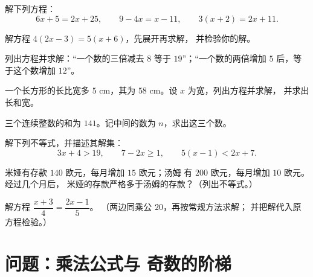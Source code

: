 \begin{exercise}[$\star$]\label{exo:g8:equations:5}
解下列方程：
\[
6x + 5 = 2x + 25, \qquad
9 - 4x = x - 11, \qquad
3(x + 2) = 2x + 11 .
\]
\end{exercise}

\begin{exercise}[$\star$]\label{exo:g8:equations:6}
解方程 $4(2x - 3) = 5(x + 6)$，先展开再求解，
并检验你的解。
\end{exercise}

\begin{exercise}[$\star$]\label{exo:g8:equations:7}
列出方程并求解：“一个数的三倍减去 $8$ 等于
$19$”；“一个数的两倍增加 $5$ 后，等于这个数增加
$12$”。
\end{exercise}

\begin{exercise}[$\star\star$]\label{exo:g8:equations:8}
一个长方形的长比宽多 $5$ cm，其为
$58$ cm。设 $x$ 为宽，列出方程并求解，
并求出长和宽。
\end{exercise}

\begin{exercise}[$\star\star$]\label{exo:g8:equations:9}
三个连续整数的和为 $141$。记中间的数为
$n$，求出这三个数。
\end{exercise}

\begin{exercise}[$\star\star$]\label{exo:g8:equations:10}
解下列不等式，并描述其解集：
\[
3x + 4 > 19, \qquad
7 - 2x \geq 1, \qquad
5(x - 1) < 2x + 7 .
\]
\end{exercise}

\begin{exercise}[$\star\star$]\label{exo:g8:equations:11}
米娅有存款 $140$ 欧元，每月增加 $15$ 欧元；汤姆
有 $200$ 欧元，每月增加 $10$ 欧元。经过几个月后，
米娅的存款严格多于汤姆的存款？（列出不等式。）
\end{exercise}

\begin{exercise}[$\star\star\star$]\label{exo:g8:equations:12}
解方程 $\dfrac{x + 3}{4} = \dfrac{2x - 1}{5}$。
（两边同乘公 $20$，再按常规方法求解；
并把解代入原方程检验。）
\end{exercise}

\section{问题：乘法公式与
奇数的阶梯}

